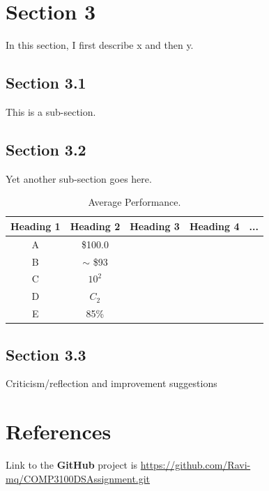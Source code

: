 \documentclass[a4paper]{article} %
\begin{document}
\section{Section 3}
\label{sec:section3}
In this section, I first describe x and then y.

\subsection{Section 3.1}
This is a sub-section.

\subsection{Section 3.2}
Yet another sub-section goes here.

\begin{table}[h!]
    \centering
    \begin{tabular}{|c|c|c|c|c|}
    \hline
        Heading 1 & Heading 2 & Heading 3 & Heading 4 & ... \\
    \hline
    A & \$100.0 &&& \\\hline
    B & $\sim$ \$93 &&& \\\hline
    C & $10^2$ &&& \\\hline
    D & $C_2$ &&& \\\hline
    E & 85\% &&& \\\hline
    \end{tabular}
    \label{tab:my_label}
    \caption{Average Performance.}
\end{table}

\subsection{Section 3.3}
Criticism/reflection and improvement suggestions


\section{References}

Link to the \textbf{GitHub} project is \url{https://github.com/Ravi-mq/COMP3100DSAssignment.git}




\end{document}
